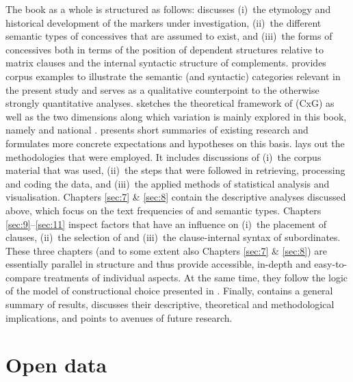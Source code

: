 The book as a whole is structured as follows:  discusses
(i)~the etymology and historical development of the markers under investigation,
(ii)~the different semantic types of concessives that are assumed to exist, and
(iii)~the forms of concessives both in terms of the position of dependent structures relative to matrix clauses and the internal syntactic structure of complements.  provides corpus examples to illustrate the semantic (and syntactic) categories relevant in the present study and serves as a qualitative counterpoint to the otherwise strongly quantitative analyses.  sketches the theoretical framework of  (CxG) as well as the two dimensions along which variation is mainly explored in this book, namely  and national .  presents short summaries of existing research and formulates more concrete expectations and hypotheses on this basis.  lays out the methodologies that were employed. It includes discussions of
(i)~the corpus material that was used,
(ii)~the steps that were followed in retrieving, processing and coding the data, and
(iii)~the applied methods of statistical analysis and visualisation. Chapters \ref{sec:7} \& \ref{sec:8} contain the descriptive analyses discussed above, which focus on the text frequencies of  and semantic types. Chapters \ref{sec:9}–\ref{sec:11} inspect factors that have an influence on
(i)~the placement of clauses,
(ii)~the selection of  and
(iii)~the clause-internal syntax of subordinates. These three chapters (and to some extent also Chapters \ref{sec:7} \& \ref{sec:8}) are essentially parallel in structure and thus provide accessible, in-depth and easy-to-compare treatments of individual aspects. At the same time, they follow the logic of the model of constructional choice presented in . Finally,  contains a general summary of results, discusses their descriptive, theoretical and methodological implications, and points to avenues of future research.

\section{\label{bkm:Ref60730938}Open data}\label{sec:1.4}


